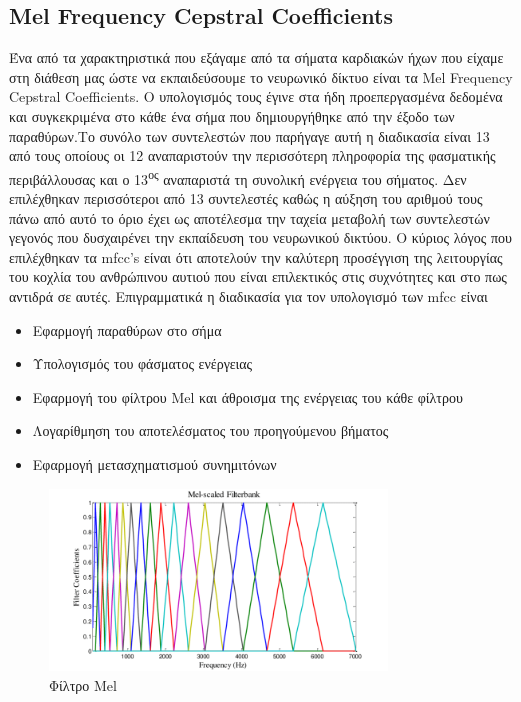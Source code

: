 \subsection{Mel Frequency Cepstral Coefficients}
Ένα από τα χαρακτηριστικά που εξάγαμε από τα σήματα καρδιακών ήχων που είχαμε
στη διάθεση μας ώστε να εκπαιδεύσουμε το νευρωνικό δίκτυο είναι τα Mel Frequency
Cepstral Coefficients. Ο υπολογισμός τους έγινε στα ήδη προεπεργασμένα δεδομένα
και συγκεκριμένα στο κάθε ένα σήμα που δημιουργήθηκε από την έξοδο των
παραθύρων.Το συνόλο των συντελεστών που παρήγαγε αυτή η διαδικασία είναι 13 από
τους οποίους οι 12 αναπαριστούν την περισσότερη πληροφορία της φασματικής
περιβάλλουσας και ο 13\textsuperscript{ος} αναπαριστά τη συνολική ενέργεια του
σήματος. Δεν επιλέχθηκαν περισσότεροι από 13 συντελεστές καθώς η αύξηση του
αριθμού τους πάνω από αυτό το όριο έχει ως αποτέλεσμα την ταχεία μεταβολή των
συντελεστών γεγονός που δυσχαιρένει την εκπαίδευση του νευρωνικού δικτύου. Ο
κύριος λόγος που επιλέχθηκαν τα mfcc's είναι ότι αποτελούν την καλύτερη
προσέγγιση της λειτουργίας του κοχλία του ανθρώπινου αυτιού που είναι
επιλεκτικός στις συχνότητες και στο πως αντιδρά σε αυτές. Επιγραμματικά η
διαδικασία για τον υπολογισμό των mfcc είναι

\begin{itemize}
	\item Εφαρμογή παραθύρων στο σήμα
	\item Υπολογισμός του φάσματος ενέργειας
	\item Εφαρμογή του φίλτρου Mel και άθροισμα της ενέργειας του κάθε φίλτρου
	\item Λογαρίθμηση του αποτελέσματος του προηγούμενου βήματος
	\item Εφαρμογή μετασχηματισμού συνημιτόνων
\end{itemize}

\begin{figure}[H]
	\center
	\includegraphics[width=0.8\textwidth]{images/MelFilter.png}
	\caption{Φίλτρο Mel}
	\label{melfilter}
\end{figure}


